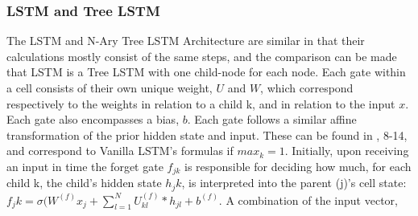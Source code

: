 \subsubsection{LSTM and Tree LSTM}
The LSTM and N-Ary Tree LSTM Architecture are similar in that their calculations
mostly consist of the same steps, and the comparison can be made that LSTM is a
Tree LSTM with one child-node for each node. Each gate within a cell consists of
their own unique weight, $U$ and $W$, which correspond respectively to the
weights in relation to a child k, and in relation to the input $x$. Each gate
also encompasses a bias, $b$. Each gate follows a similar affine transformation
of the prior hidden state and input. These can be found in
\cite{tai2015improved}, 8-14, and correspond to Vanilla LSTM's formulas if
$max_k=1$. Initially, upon receiving an input in time the forget gate $f_{jk}$
is responsible for deciding how much, for each child k, the child's hidden state
$h_jk$, is interpreted into the parent (j)'s cell state: $f_jk =
\sigma(W^{(f)}x_j+\sum\limits^{N}_{l=1}U_{kl}^{(f)}*h_{jl}+b^{(f)}$. A
combination of the input vector,
